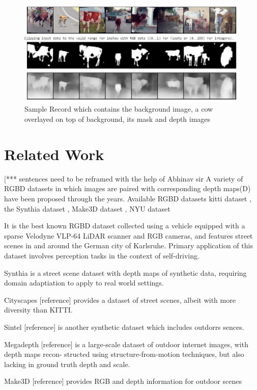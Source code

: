 \documentclass{article}
\begin{document}
\begin{figure}[h!]
\centering
  \includegraphics[width=1\textwidth]{unseen.jpeg}
  \caption{Sample Record which contains the background image, a cow overlayed on top of background, its mask and depth images}
  \label{fig:samplerecord}
\end{figure}


\section {Related Work}
[*** sentences need to be reframed with the help of Abhinav sir
A variety of RGBD datasets in which images are paired with corresponding depth maps(D) have been proposed through the years.
Available RGBD datasets
kitti dataset \cite{geiger2013vision}, the Synthia dataset \cite{ros2016synthia}, Make3D dataset \cite{saxena2008make3d}, NYU dataset \cite{silberman2012indoor}

It is the best known RGBD dataset collected using a vehicle equipped with a sparse Velodyne VLP-64 LiDAR scanner and RGB cameras, and features street scenes in and around the German city of Karlsruhe. Primary application of this dataset involves perception tasks in the context of self-driving.

Synthia is a street scene dataset with depth maps of synthetic data, requiring domain adaptiation to apply to real world settings. 

Cityscapes [reference] provides a dataset of street scenes, albeit with more diversity than KITTI.

Sintel [reference] is another synthetic dataset which includes outdorrs sences.

Megadepth [reference] is a large-scale dataset of outdoor internet images, with depth maps recon- structed using structure-from-motion techniques, but also lacking in ground truth depth and scale.

Make3D [reference] provides RGB and depth information for outdoor scenes
\end{document}
